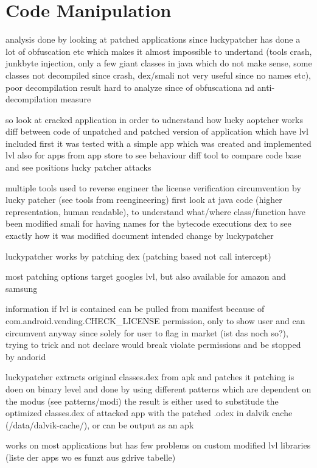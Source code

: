 \section{Code Manipulation} \label{section:luckypatcher-operation}
analysis done by looking at patched applications since luckypatcher has done a lot of obfuscation etc which makes it almost impossible to undertand (tools crash, junkbyte injection, only a few giant classes in java which do not make sense, some classes not decompiled since crash, dex/smali not very useful since no names etc), poor decompilation result
hard to analyze since of obfuscationa nd anti-decompilation measure

so look at cracked application in order to udnerstand how lucky aoptcher works
diff between code of unpatched and patched version of application which have lvl included
first it was tested with a simple app which was created and implemented lvl
also for apps from app store to see behaviour
diff tool to compare code base and see positions lucky patcher attacks

multiple tools used to reverse engineer the license verification circumvention by lucky patcher (see tools from reengineering)
first look at java code (higher representation, human readable), to understand what/where class/function have been modified
smali for having names for the bytecode executions
dex to see exactly how it was modified
document intended change by luckypatcher

luckypatcher works by patching dex (patching based not call intercept)

most patching options target googles lvl, but also available for amazon and samsung

information if lvl is contained can be pulled from manifest because of com.android.vending.CHECK\_LICENSE permission, only to show user and can circumvent anyway since solely for user to flag in market (ist das noch so?), trying to trick and not declare would break violate permissions and be stopped by andorid

luckypatcher extracts original classes.dex from apk and patches it
patching is doen on binary level and done by using different patterns which are dependent on the modus (see patterns/modi)
the result is either used to substitude the optimized classes.dex of attacked app with the patched .odex in dalvik cache (/data/dalvik-cache/), or can be output as an apk

works on most applications but has few problems on custom modified lvl libraries (liste der apps wo es funzt aus gdrive tabelle)


